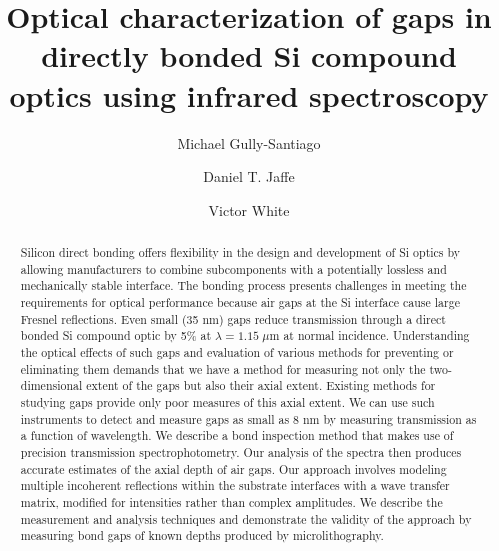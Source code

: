 \documentclass[osajnl,preprint,showpacs,superscriptaddress,12pt]{revtex4-1} %
\begin{document}
\title{Optical characterization of gaps in directly bonded Si compound optics using infrared spectroscopy}

\author{Michael Gully-Santiago}
\author{Daniel T. Jaffe}

\author{Victor White}


\begin{abstract}
Silicon direct bonding offers flexibility in the design and development of Si optics by allowing manufacturers to combine subcomponents with a potentially lossless and mechanically stable interface. The bonding process presents challenges in meeting the requirements for optical performance because air gaps at the Si interface cause large Fresnel reflections. Even small (35 nm) gaps reduce transmission through a direct bonded Si compound optic by 5\% at $\lambda = 1.15 \; \mu$m at normal incidence. Understanding the optical effects of such gaps and evaluation of various methods for preventing or eliminating them demands that we have a method for measuring not only the two-dimensional extent of the gaps but also their axial extent.  Existing methods for studying gaps provide only poor measures of this axial extent. We can use such instruments to detect and measure gaps as small as 8 nm by measuring transmission as a function of wavelength. We describe a bond inspection method that makes use of precision transmission spectrophotometry. Our analysis of the spectra then produces accurate estimates of the axial depth of air gaps.  Our approach involves modeling multiple incoherent reflections within the substrate interfaces with a wave transfer matrix, modified for intensities rather than complex amplitudes. We describe the measurement and analysis techniques and demonstrate the validity of the approach by measuring bond gaps of known depths produced by microlithography.
\end{abstract}


\maketitle %
\end{document}
